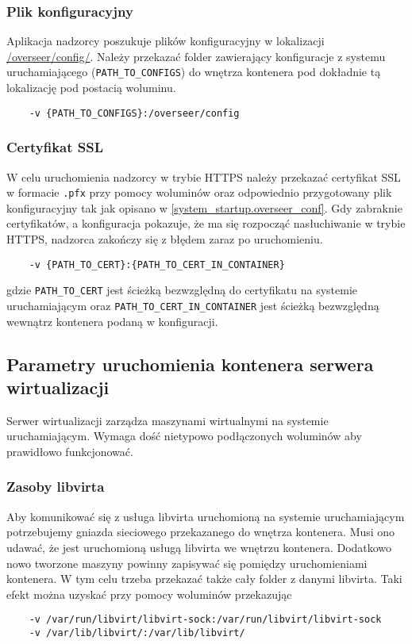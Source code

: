 \documentclass[../opis-rozwiazania.tex]{subfiles}
\begin{document}
\subsubsection{Plik konfiguracyjny}
Aplikacja nadzorcy poszukuje plików konfiguracyjny w lokalizacji \url{/overseer/config/}.
Należy przekazać folder zawierający konfiguracje z systemu uruchamiającego (\texttt{PATH\_TO\_CONFIGS}) do wnętrza kontenera pod dokładnie tą lokalizację pod postacią woluminu.
\begin{verbatim}
	-v {PATH_TO_CONFIGS}:/overseer/config
\end{verbatim}

\subsubsection{Certyfikat SSL}
W celu uruchomienia nadzorcy w trybie HTTPS należy przekazać certyfikat SSL w formacie \texttt{.pfx} przy pomocy woluminów oraz odpowiednio przygotowany plik konfiguracyjny tak jak opisano w \ref{system_startup.overseer_conf}.
Gdy zabraknie certyfikatów, a konfiguracja pokazuje, że ma się rozpocząć nasłuchiwanie w trybie HTTPS, nadzorca zakończy się z błędem zaraz po uruchomieniu.

\begin{verbatim}
	-v {PATH_TO_CERT}:{PATH_TO_CERT_IN_CONTAINER}
\end{verbatim}
gdzie \texttt{PATH\_TO\_CERT} jest ścieżką bezwzględną do certyfikatu na systemie uruchamiającym oraz \texttt{PATH\_TO\_CERT\_IN\_CONTAINER} jest ścieżką bezwzględną wewnątrz kontenera podaną w konfiguracji.

\subsection{Parametry uruchomienia kontenera serwera wirtualizacji}
Serwer wirtualizacji zarządza maszynami wirtualnymi na systemie uruchamiającym.
Wymaga dość nietypowo podłączonych woluminów aby prawidłowo funkcjonować.

\subsubsection{Zasoby libvirta}
Aby komunikować się z usługa libvirta uruchomioną na systemie uruchamiającym potrzebujemy gniazda sieciowego przekazanego do wnętrza kontenera.
Musi ono udawać, że jest uruchomioną usługą libvirta we wnętrzu kontenera.
Dodatkowo nowo tworzone maszyny powinny zapisywać się pomiędzy uruchomieniami kontenera.
W tym celu trzeba przekazać także cały folder z danymi libvirta.
Taki efekt można uzyskać przy pomocy woluminów przekazując
\begin{verbatim}
	-v /var/run/libvirt/libvirt-sock:/var/run/libvirt/libvirt-sock
	-v /var/lib/libvirt/:/var/lib/libvirt/
\end{verbatim}
\end{document}
